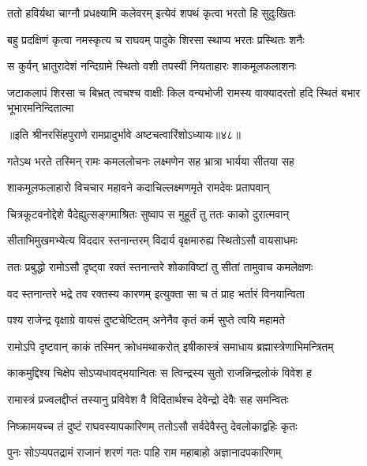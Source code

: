\twolineshloka
{ततो हविर्यथा चाग्नौ प्रधक्ष्यामि कलेवरम्}
{इत्येवं शपथं कृत्वा भरतो हि सुदुःखितः} %

\twolineshloka
{बहु प्रदक्षिणं कृत्वा नमस्कृत्य च राघवम्}
{पादुके शिरसा स्थाप्य भरतः प्रस्थितः शनैः} %

\twolineshloka
{स कुर्वन् भ्रातुरादेशं नन्दिग्रामे स्थितो वशी}
{तपस्वी नियताहारः शाकमूलफलाशनः} %

\fourlineindentedshloka
{जटाकलापं शिरसा च बिभ्रत्}
{त्वचश्च वाक्षीः किल वन्यभोजी}
{रामस्य वाक्यादरतो हदि स्थितं}
{बभार भूभारमनिन्दितात्मा} %

॥इति श्रीनरसिंहपुराणे रामप्रादुर्भावे अष्टचत्वारिंशोऽध्यायः॥४८॥



\twolineshloka
{गतेऽथ भरते तस्मिन् रामः कमललोचनः}
{लक्ष्मणेन सह भ्रात्रा भार्यया सीतया सह} %

\twolineshloka
{शाकमूलफलाहारो विचचार महावने}
{कदाचिल्लक्ष्मणमृते रामदेवः प्रतापवान्} %

\twolineshloka
{चित्रकूटवनोद्देशे वैदेह्युत्सङ्गमाश्रितः}
{सुष्वाप स मुहूर्तं तु ततः काको दुरात्मवान्} %

\twolineshloka
{सीताभिमुखमभ्येत्य विददार स्तनान्तरम्}
{विदार्य वृक्षमारुह्य स्थितोऽसौ वायसाधमः} %

\twolineshloka
{ततः प्रबुद्धो रामोऽसौ दृष्ट्वा रक्तं स्तनान्तरे}
{शोकाविष्टां तु सीतां तामुवाच कमलेक्षणः} %

\twolineshloka
{वद स्तनान्तरे भद्रे तव रक्तस्य कारणम्}
{इत्युक्ता सा च तं प्राह भर्तारं विनयान्विता} %

\twolineshloka
{पश्य राजेन्द्र वृक्षाग्रे वायसं दुष्टचेष्टितम्}
{अनेनैव कृतं कर्म सुप्ते त्वयि महामते} %

\twolineshloka
{रामोऽपि दृष्टवान् काकं तस्मिन् क्रोधमथाकरोत्}
{इषीकास्त्रं समाधाय ब्रह्मास्त्रेणाभिमन्त्रितम्} %

\twolineshloka
{काकमुद्दिश्य चिक्षेप सोऽप्यधावद्भयान्वितः}
{स त्विन्द्रस्य सुतो राजन्निन्द्रलोकं विवेश ह} %

\twolineshloka
{रामास्त्रं प्रज्वलद्दीप्तं तस्यानु प्रविवेश वै}
{विदितार्थश्च देवेन्द्रो देवैः सह समन्वितः} %

\twolineshloka
{निष्क्रामयच्च तं दुष्टं राघवस्यापकारिणम्}
{ततोऽसौ सर्वदेवैस्तु देवलोकाद्वहिः कृतः} %

\twolineshloka
{पुनः सोऽप्यपतद्रामं राजानं शरणं गतः}
{पाहि राम महाबाहो अज्ञानादपकारिणम्} %

